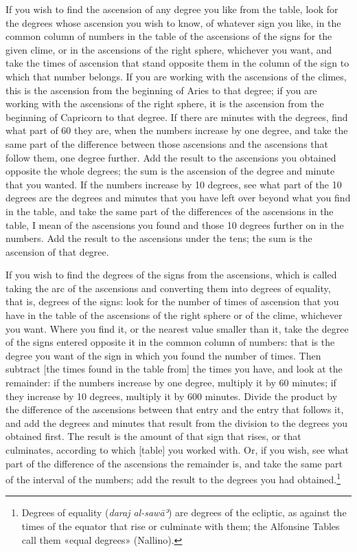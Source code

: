 \documentclass[11pt]{article}
\newcommand{\ArPage}[1]{\marginpar{\footnotesize\color{gray}Ar.\,p.\,#1}}
\begin{document}
\par \ArPage{41}If you wish to find the ascension of any degree you like from the table, look for the degrees whose ascension you wish to know, of whatever sign you like, in the common column of numbers in the table of the ascensions of the signs for the given clime, or in the ascensions of the right sphere, whichever you want, and take the times of ascension that stand opposite them in the column of the sign to which that number belongs. If you are working with the ascensions of the climes, this is the ascension from the beginning of Aries to that degree; if you are working with the ascensions of the right sphere, it is the ascension from the beginning of Capricorn to that degree. If there are minutes with the degrees, find what part of 60 they are, when the numbers increase by one degree, and take the same part of the difference between those ascensions and the ascensions that follow them, one degree further. Add the result to the ascensions you obtained opposite the whole degrees; the sum is the ascension of the degree and minute that you wanted. If the numbers increase by 10 degrees, see what part of the 10 degrees are the degrees and minutes that you have left over beyond what you find in the table, and take the same part of the differences of the ascensions in the table, I mean of the ascensions you found and those 10 degrees further on in the numbers. Add the result to the ascensions under the tens; the sum is the ascension of that degree.\par
\par If you wish to find the degrees of the signs from the ascensions, which is called taking the arc of the ascensions and converting them into degrees of equality, that is, degrees of the signs: look for the number of times of ascension that you have in the table of the ascensions of the right sphere or of the clime, whichever you want. Where you find it, or the nearest value smaller than it, take the degree of the signs entered opposite it in the common column of numbers: that is the degree you want of the sign in which you found the number of times. Then subtract [the times found in the table from] the times you have, and look at the remainder: if the numbers increase by one degree, multiply it by 60 minutes; if they increase by 10 degrees, multiply it by 600 minutes. Divide the product by the difference of the ascensions between that entry and the entry that follows it, and add the degrees and minutes that result from the division to the degrees you obtained first. The result is the amount of that sign that rises, or that culminates, according to which [table] you worked with. Or, if you wish, see what part of the difference of the ascensions the remainder is, and take the same part of the interval of the numbers; add the result to the degrees you had obtained.\footnote{Degrees of equality (\emph{daraj al-sawāʾ}) are degrees of the ecliptic, as against the times of the equator that rise or culminate with them; the Alfonsine Tables call them «equal degrees» (Nallino).}\par
\end{document}
